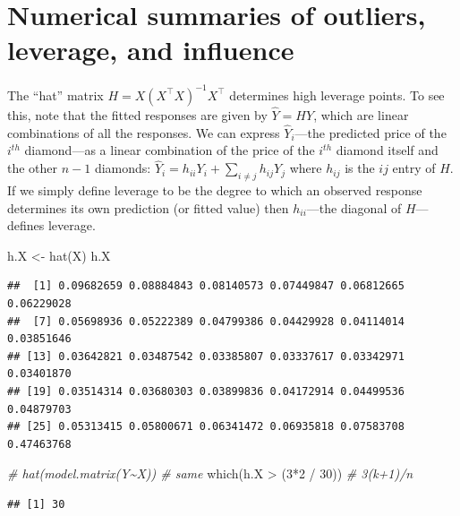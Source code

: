 \documentclass[
]{book}
\newenvironment{Shaded}{\begin{snugshade}}{\end{snugshade}}
\newcommand{\CommentTok}[1]{\textcolor[rgb]{0.56,0.35,0.01}{\textit{#1}}}
\newcommand{\DecValTok}[1]{\textcolor[rgb]{0.00,0.00,0.81}{#1}}
\newcommand{\FunctionTok}[1]{\textcolor[rgb]{0.00,0.00,0.00}{#1}}
\newcommand{\NormalTok}[1]{#1}
\newcommand{\OtherTok}[1]{\textcolor[rgb]{0.56,0.35,0.01}{#1}}
\newcommand{\SpecialCharTok}[1]{\textcolor[rgb]{0.00,0.00,0.00}{#1}}
\begin{document}
\hypertarget{numerical-summaries-of-outliers-leverage-and-influence}{%
\section{Numerical summaries of outliers, leverage, and influence}\label{numerical-summaries-of-outliers-leverage-and-influence}}

The ``hat'' matrix \(H = X(X^\top X)^{-1}X^\top\) determines high leverage points. To see this, note that the fitted responses are given by \(\hat Y = H Y\), which are linear combinations of all the responses. We can express \(\hat Y_i\)---the predicted price of the \(i^{th}\) diamond---as a linear combination of the price of the \(i^{th}\) diamond itself and the other \(n-1\) diamonds: \(\hat Y_i = h_{ii}Y_i + \sum_{i\ne j} h_{ij}Y_j\) where \(h_{ij}\) is the \(ij\) entry of \(H\). If we simply define leverage to be the degree to which an observed response determines its own prediction (or fitted value) then \(h_{ii}\)---the diagonal of \(H\)---defines leverage.

\begin{Shaded}
\begin{Highlighting}[]
\NormalTok{h.X }\OtherTok{\textless{}{-}} \FunctionTok{hat}\NormalTok{(X)}
\NormalTok{h.X}
\end{Highlighting}
\end{Shaded}

\begin{verbatim}
##  [1] 0.09682659 0.08884843 0.08140573 0.07449847 0.06812665 0.06229028
##  [7] 0.05698936 0.05222389 0.04799386 0.04429928 0.04114014 0.03851646
## [13] 0.03642821 0.03487542 0.03385807 0.03337617 0.03342971 0.03401870
## [19] 0.03514314 0.03680303 0.03899836 0.04172914 0.04499536 0.04879703
## [25] 0.05313415 0.05800671 0.06341472 0.06935818 0.07583708 0.47463768
\end{verbatim}

\begin{Shaded}
\begin{Highlighting}[]
\CommentTok{\# hat(model.matrix(Y\textasciitilde{}X))   \# same}
\FunctionTok{which}\NormalTok{(h.X }\SpecialCharTok{\textgreater{}}\NormalTok{ (}\DecValTok{3}\SpecialCharTok{*}\DecValTok{2} \SpecialCharTok{/} \DecValTok{30}\NormalTok{))   }\CommentTok{\# 3(k+1)/n}
\end{Highlighting}
\end{Shaded}

\begin{verbatim}
## [1] 30
\end{verbatim}
\end{document}
